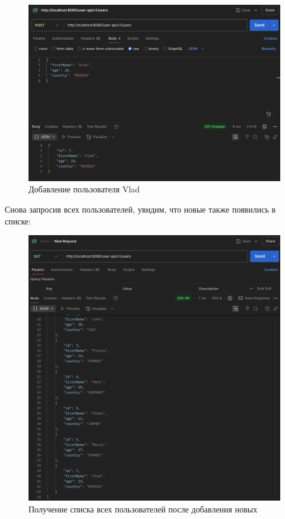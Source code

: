 \documentclass[a4paper, 14pt]{article}
\begin{document}
\begin{figure}[H]
	\centering
	\includegraphics[width=15cm]{resources/7.png}
	\caption{Добавление пользователя Vlad}
\end{figure}

Снова запросив всех пользователей, увидим, что новые также появились в списке:

\begin{figure}[H]
	\centering
	\includegraphics[width=15cm]{resources/8.png}
	\caption{Получение списка всех пользователей после добавления новых}
\end{figure}
\end{document}
